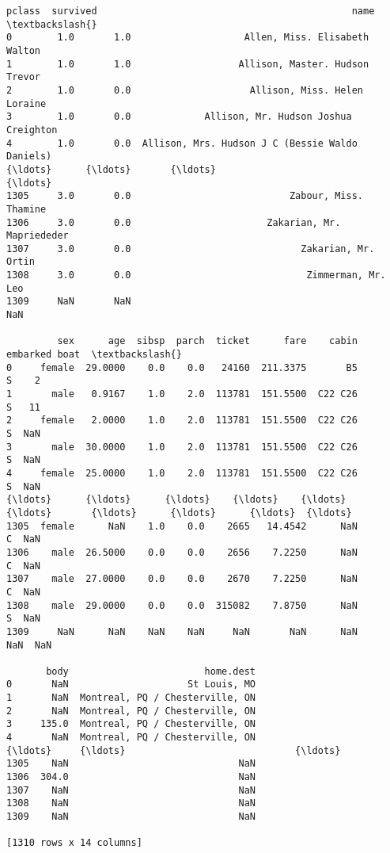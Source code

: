 \documentclass[11pt]{article}
\makeatletter
\newcommand{\boxspacing}{\kern\kvtcb@left@rule\kern\kvtcb@boxsep}
\newcommand{\prompt}[4]{
        {\ttfamily\llap{{\color{#2}[#3]:\hspace{3pt}#4}}\vspace{-\baselineskip}}
    }
\makeatother
\begin{document}
            \begin{tcolorbox}[breakable, size=fbox, boxrule=.5pt, pad at break*=1mm, opacityfill=0]
\prompt{Out}{outcolor}{64}{\boxspacing}
\begin{Verbatim}[commandchars=\\\{\}]
      pclass  survived                                             name  \textbackslash{}
0        1.0       1.0                    Allen, Miss. Elisabeth Walton
1        1.0       1.0                   Allison, Master. Hudson Trevor
2        1.0       0.0                     Allison, Miss. Helen Loraine
3        1.0       0.0             Allison, Mr. Hudson Joshua Creighton
4        1.0       0.0  Allison, Mrs. Hudson J C (Bessie Waldo Daniels)
{\ldots}      {\ldots}       {\ldots}                                              {\ldots}
1305     3.0       0.0                            Zabour, Miss. Thamine
1306     3.0       0.0                        Zakarian, Mr. Mapriededer
1307     3.0       0.0                              Zakarian, Mr. Ortin
1308     3.0       0.0                               Zimmerman, Mr. Leo
1309     NaN       NaN                                              NaN

         sex      age  sibsp  parch  ticket      fare    cabin embarked boat  \textbackslash{}
0     female  29.0000    0.0    0.0   24160  211.3375       B5        S    2
1       male   0.9167    1.0    2.0  113781  151.5500  C22 C26        S   11
2     female   2.0000    1.0    2.0  113781  151.5500  C22 C26        S  NaN
3       male  30.0000    1.0    2.0  113781  151.5500  C22 C26        S  NaN
4     female  25.0000    1.0    2.0  113781  151.5500  C22 C26        S  NaN
{\ldots}      {\ldots}      {\ldots}    {\ldots}    {\ldots}     {\ldots}       {\ldots}      {\ldots}      {\ldots}  {\ldots}
1305  female      NaN    1.0    0.0    2665   14.4542      NaN        C  NaN
1306    male  26.5000    0.0    0.0    2656    7.2250      NaN        C  NaN
1307    male  27.0000    0.0    0.0    2670    7.2250      NaN        C  NaN
1308    male  29.0000    0.0    0.0  315082    7.8750      NaN        S  NaN
1309     NaN      NaN    NaN    NaN     NaN       NaN      NaN      NaN  NaN

       body                        home.dest
0       NaN                     St Louis, MO
1       NaN  Montreal, PQ / Chesterville, ON
2       NaN  Montreal, PQ / Chesterville, ON
3     135.0  Montreal, PQ / Chesterville, ON
4       NaN  Montreal, PQ / Chesterville, ON
{\ldots}     {\ldots}                              {\ldots}
1305    NaN                              NaN
1306  304.0                              NaN
1307    NaN                              NaN
1308    NaN                              NaN
1309    NaN                              NaN

[1310 rows x 14 columns]
\end{Verbatim}
\end{tcolorbox}
        
\end{document}
